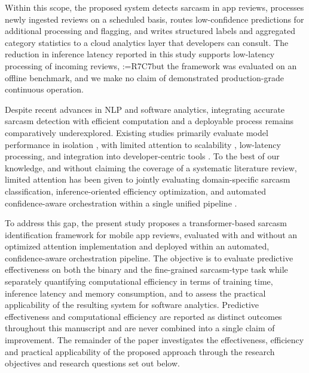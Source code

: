 \documentclass[a4paper,fleqn]{cas-sc}
\makeatletter
\newif\iftracked
\newcommand{\rv@setcolour}[1]{%
  \IfStrEq{#1}{R7C7}{\color{rvEdit}}{%
    \IfSubStr{#1}{R5}{\IfSubStr{#1}{R7}{\color{rvBoth}}{\color{rvFive}}}{\color{rvSeven}}}}
\newcommand{\rv@tag}[1]{\textsuperscript{\sffamily\bfseries\scriptsize[\StrSubstitute{#1}{,}{, }]}\,}
\newcommand{\rv@recordone}[1]{%
  \edef\rv@i{#1}%
  \ifcsdef{rv@n@\rv@i}{}{\csgdef{rv@n@\rv@i}{0}}%
  \csxdef{rv@n@\rv@i}{\the\numexpr\csuse{rv@n@\rv@i}+1\relax}%
  \begingroup\edef\@currentlabel{\rv@i}\label{rv:\rv@i:\csuse{rv@n@\rv@i}}\endgroup}
\newcommand{\rv@record}[1]{\@for\rv@id:=#1\do{\expandafter\rv@recordone\expandafter{\rv@id}}}
\DeclareRobustCommand{\rcrep}[3]{\rv@record{#1}\iftracked{\rv@setcolour{#1}\rv@tag{#1}\rv@strike{#2} #3}\else#3\fi}
\makeatother
\begin{document}
Within this scope, the proposed system detects sarcasm in app reviews, processes newly ingested reviews on a scheduled basis, routes low-confidence predictions for additional processing and flagging, and writes structured labels and aggregated category statistics to a cloud analytics layer that developers can consult. The reduction in inference latency reported in this study supports low-latency processing of incoming reviews, \rcrep{R7C7}{although the framework is integrated into an automated, confidence-aware orchestration pipeline, and}{but the framework was evaluated on an offline benchmark, and} we make no claim of demonstrated production-grade continuous operation.

Despite recent advances in NLP and software analytics, integrating accurate sarcasm detection with efficient computation and a deployable process remains comparatively underexplored. Existing studies primarily evaluate model performance in isolation \citep{savaryleblanc2023software}, with limited attention to scalability \citep{putri2025sarcasm}, low-latency processing, and integration into developer-centric tools \citep{shinn2023reflexion}. To the best of our knowledge, and without claiming the coverage of a systematic literature review, limited attention has been given to jointly evaluating domain-specific sarcasm classification, inference-oriented efficiency optimization, and automated confidence-aware orchestration within a single unified pipeline \citep{yasmin2025empirical,schick2023toolformer,yao2023react,haghsheno2020revolutionizing}.

To address this gap, the present study proposes a transformer-based sarcasm identification framework for mobile app reviews, evaluated with and without an optimized attention implementation and deployed within an automated, confidence-aware orchestration pipeline. The objective is to evaluate predictive effectiveness on both the binary and the fine-grained sarcasm-type task while separately quantifying computational efficiency in terms of training time, inference latency and memory consumption, and to assess the practical applicability of the resulting system for software analytics. Predictive effectiveness and computational efficiency are reported as distinct outcomes throughout this manuscript and are never combined into a single claim of improvement. The remainder of the paper investigates the effectiveness, efficiency and practical applicability of the proposed approach through the research objectives and research questions set out below.
\end{document}
